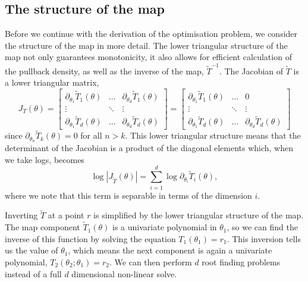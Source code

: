 \documentclass[final]{siamltex}
\begin{document}
\subsection{The structure of the map}

Before we continue with the derivation of the optimisation problem, we consider the structure
of the map in more detail. The lower triangular structure of the map not only guarantees monotonicity, it also allows for efficient calculation of the pullback density, as well as the inverse of the map, $\tilde{T}^{-1}$. The Jacobian of $\tilde{T}$ is a lower triangular matrix,
\[
	J_T(\theta) = \begin{bmatrix}
		\partial_{\theta_1} \tilde{T}_1(\theta) & \dots & \partial_{\theta_d} \tilde{T}_1(\theta)\\
		\vdots & \ddots & \vdots \\
		\partial_{\theta_1} \tilde{T}_d(\theta) & \dots & \partial_{\theta_d} \tilde{T}_d(\theta)
	\end{bmatrix} = \begin{bmatrix}
		\partial_{\theta_1} \tilde{T}_1(\theta) & \dots & 0\\
		\vdots & \ddots & \vdots \\
		\partial_{\theta_1} \tilde{T}_d(\theta) & \dots & \partial_{\theta_d} \tilde{T}_d(\theta)
	\end{bmatrix}
\]
since $\partial_{\theta_n} \tilde{T}_k(\theta) = 0$ for all $n > k$. This lower triangular structure means that the determinant of the Jacobian is a product of the diagonal elements which, when we take logs, becomes
\begin{equation}\label{eqn:separable_jacobian}
	\log\left|J_{\tilde{T}}(\theta)\right| = \sum\limits_{i=1}^d \! \log \partial_{\theta_i} \tilde{T}_i(\theta),
\end{equation}
where we note that this term is separable in terms of the dimension $i$.

Inverting $\tilde{T}$ at a point $r$ is simplified by the lower triangular structure of the map. The map component $\tilde{T}_1(\theta)$ is a univariate polynomial in $\theta_1$, so we can find the inverse of this function by solving the equation $T_1(\theta_1) = r_1$. This inversion tells us the value of $\theta_1$, which means the next component is again a univariate polynomial, $T_2(\theta_2; \theta_1)=r_2$. We can then perform $d$ root finding problems instead of a full $d$ dimensional non-linear solve.
\end{document}
